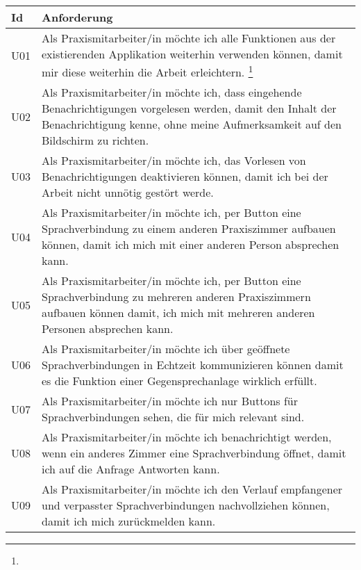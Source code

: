 \begin{table}[h]
    \centering
    \begin{tabular}{|l|p{15cm}|}
        \hline
        \textbf{Id} & \textbf{Anforderung}                                                                                                                                                                                      \\
        \hline
        U01         & Als Praxismitarbeiter/in möchte ich alle Funktionen aus der existierenden Applikation weiterhin verwenden können, damit mir diese weiterhin die Arbeit erleichtern. \footnote[2]{}                        \\
        \hline
        U02         & Als Praxismitarbeiter/in möchte ich, dass eingehende Benachrichtigungen vorgelesen werden, damit den Inhalt der Benachrichtigung kenne, ohne meine Aufmerksamkeit auf den Bildschirm zu richten. \\
        \hline
        U03         & Als Praxismitarbeiter/in möchte ich, das Vorlesen von Benachrichtigungen deaktivieren können, damit ich bei der Arbeit nicht unnötig gestört werde.                                                       \\
        \hline
        U04         & Als Praxismitarbeiter/in möchte ich, per Button eine Sprachverbindung zu einem anderen Praxiszimmer aufbauen können, damit ich mich mit einer anderen Person absprechen kann.                             \\
        \hline
        U05 & Als Praxismitarbeiter/in möchte ich, per Button eine Sprachverbindung zu mehreren anderen Praxiszimmern aufbauen können damit, ich mich mit mehreren anderen Personen absprechen kann. \\
        \hline
        U06 & Als Praxismitarbeiter/in möchte ich über geöffnete Sprachverbindungen in Echtzeit kommunizieren können damit es die Funktion einer Gegensprechanlage wirklich erfüllt.                 \\
        \hline
        U07 & Als Praxismitarbeiter/in möchte ich nur Buttons für Sprachverbindungen sehen, die für mich relevant sind.                                                                              \\
        \hline
        U08 & Als Praxismitarbeiter/in möchte ich benachrichtigt werden, wenn ein anderes Zimmer eine Sprachverbindung öffnet, damit ich auf die Anfrage Antworten kann.                             \\
        \hline
        U09 & Als Praxismitarbeiter/in möchte ich den Verlauf empfangener und verpasster Sprachverbindungen nachvollziehen können, damit ich mich zurückmelden kann.                                               \\

\end{tabular}
\end{table}
